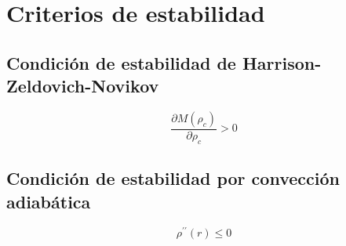 \section{Criterios de estabilidad}

\subsection{Condición de estabilidad de Harrison-Zeldovich-Novikov}

\begin{equation}
    \frac { \partial M \left( \rho _ { c } \right) } { \partial \rho _ { c } } > 0
\end{equation}


\subsection{Condición de estabilidad por convección adiabática}

\begin{equation}
    \rho ^ { \prime \prime } ( r ) \leq 0
\end{equation}
